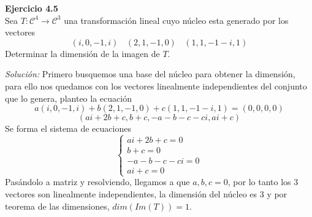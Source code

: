 \documentclass{article}
\newenvironment{problem}[2][Ejercicio]
    { \begin{mdframed}[backgroundcolor=gray!20] \textbf{#1 #2} \\}
    {  \end{mdframed}}
\newenvironment{solution}
    {\textit{Solución:}}
    {}
\begin{document}
\begin{problem}{4.5}
    Sea $T:\mathcal{C}^4 \to \mathcal{C}^3$ una transformación lineal cuyo núcleo esta generado por los vectores
\[
(i,0,-1,i) \ \ \ \ (2,1,-1,0) \ \ \ \ (1,1,-1-i,1)
\]
Determinar la dimensión de la imagen de $T$.
\end{problem}
\begin{solution}
    Primero busquemos una base del núcleo para obtener la dimensión, para ello nos quedamos con los vectores linealmente independientes del conjunto que lo genera, planteo la ecuación
\[
a(i,0,-1,i)+b(2,1,-1,0)+c(1,1,-1-i,1) = (0,0,0,0)
\]\[
(ai+2b+c,b+c,-a-b-c-ci,ai+c)
\]
Se forma el sistema de ecuaciones
\[
\begin{cases}
ai+2b+c = 0 \\
b+c = 0 \\
-a-b-c-ci = 0 \\
ai+c = 0
\end{cases}
\]
Pasándolo a matriz y resolviendo, llegamos a que $a,b,c=0$, por lo tanto los $3$ vectores son linealmente independientes, la dimensión del núcleo es $3$ y por teorema de las dimensiones, $dim(Im(T))=1$.
\end{solution}
\end{document}

